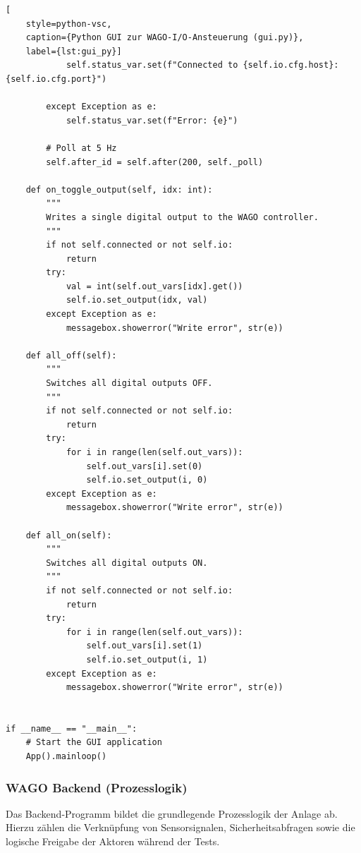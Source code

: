 \begin{lstlisting}[
    style=python-vsc,
    caption={Python GUI zur WAGO-I/O-Ansteuerung (gui.py)},
    label={lst:gui_py}]
            self.status_var.set(f"Connected to {self.io.cfg.host}:{self.io.cfg.port}")

        except Exception as e:
            self.status_var.set(f"Error: {e}")

        # Poll at 5 Hz
        self.after_id = self.after(200, self._poll)

    def on_toggle_output(self, idx: int):
        """
        Writes a single digital output to the WAGO controller.
        """
        if not self.connected or not self.io:
            return
        try:
            val = int(self.out_vars[idx].get())
            self.io.set_output(idx, val)
        except Exception as e:
            messagebox.showerror("Write error", str(e))

    def all_off(self):
        """
        Switches all digital outputs OFF.
        """
        if not self.connected or not self.io:
            return
        try:
            for i in range(len(self.out_vars)):
                self.out_vars[i].set(0)
                self.io.set_output(i, 0)
        except Exception as e:
            messagebox.showerror("Write error", str(e))

    def all_on(self):
        """
        Switches all digital outputs ON.
        """
        if not self.connected or not self.io:
            return
        try:
            for i in range(len(self.out_vars)):
                self.out_vars[i].set(1)
                self.io.set_output(i, 1)
        except Exception as e:
            messagebox.showerror("Write error", str(e))


if __name__ == "__main__":
    # Start the GUI application
    App().mainloop()
\end{lstlisting}

\clearpage

\subsubsection{WAGO Backend (Prozesslogik)}
Das Backend-Programm bildet die grundlegende Prozesslogik der Anlage ab.
Hierzu zählen die Verknüpfung von Sensorsignalen, Sicherheitsabfragen sowie die logische Freigabe der Aktoren während der Tests.

